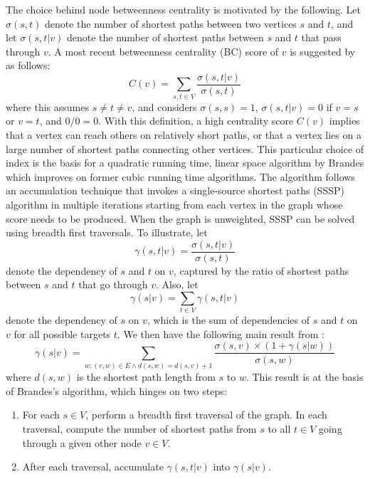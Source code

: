 The choice behind node betweenness centrality is motivated by the following. Let $\sigma(s,t)$ denote the number of shortest paths between two vertices $s$ and $t$, and let $\sigma(s,t \left \vert \right. v)$ denote the number of shortest paths between $s$ and $t$ that pass through $v$. A most recent betweenness centrality (BC) score of $v$ is suggested by \cite{Brandes01} as follows:
\begin{equation}
C(v) = \sum_{s,t \in V} \frac{\sigma(s,t \left \vert \right. v)}{\sigma(s,t)}
\label{brandesBC}
\end{equation}
where this assumes $s \neq t \neq v$, and considers $\sigma(s,s)=1$, $\sigma(s,t \left \vert \right. v)=0$ if $v = s$ or $v=t$, and $0/0 = 0$. With this definition, a high centrality score $C(v)$ implies that a vertex can reach others on relatively short paths, or that a vertex lies on a large number of shortest paths connecting other vertices. This particular choice of index is the basis for a quadratic running time, linear space algorithm by Brandes which improves on former cubic running time algorithms. The algorithm follows an accumulation technique that invokes a single-source shortest paths (SSSP) algorithm in multiple iterations starting from each vertex in the graph whose score needs to be produced. When the graph is unweighted, SSSP can be solved using breadth first traversals. To illustrate, let 
\begin{equation*}
\gamma(s, t \left \vert \right. v) = \frac{\sigma(s, t \left \vert \right. v)}{\sigma(s,t)}
\end{equation*}
denote the dependency of $s$ and $t$ on $v$, captured by the ratio of shortest paths between $s$ and $t$ that go through $v$. Also, let 
\begin{equation*}
\gamma(s \left \vert \right. v ) = \sum_{t \in V} \gamma(s,t \left \vert \right. v )
\end{equation*}
denote the dependency of $s$ on $v$, which is the sum of dependencies of $s$ and $t$ on $v$ for all possible targets $t$. 
We then have the following main result from \cite{Brandes01}:
\begin{equation*}
\gamma(s \left \vert \right. v ) = \sum_{w: (v,w) \in E \land d(s,w) = d(s,v)+1} \frac{\sigma(s,v)\times (1+\gamma(s\left \vert \right. w))}{\sigma(s,w)}
\end{equation*}
where $d(s,w)$ is the shortest path length from $s$ to $w$. This result is at the basis of Brandes's algorithm, which hinges on two steps:
\begin{enumerate}
\item For each $s \in V$, perform a breadth first traversal of the graph. In each traversal, compute the number of shortest paths from $s$ to all $t \in V$ going through a given other node $v \in V$. 
\item After each traversal, accumulate $\gamma (s,t \left \vert \right. v)$ into $\gamma(s \left \vert \right. v)$.
\end{enumerate}

